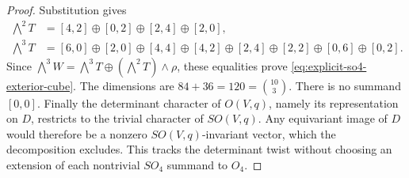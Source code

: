 \begin{proof}
Substitution gives
\begin{align*}
 \bigwedge^2T&=[4,2]\oplus[0,2]\oplus[2,4]\oplus[2,0],\\
 \bigwedge^3T&=[6,0]\oplus[2,0]\oplus[4,4]\oplus[4,2]
       \oplus[2,4]\oplus[2,2]\oplus[0,6]\oplus[0,2].
\end{align*}
Since \(\bigwedge^3W=\bigwedge^3T\oplus
(\bigwedge^2T)\wedge\rho\), these equalities prove
\eqref{eq:explicit-so4-exterior-cube}.  The dimensions are
\(84+36=120=\binom{10}{3}\).  There is no summand \([0,0]\).
Finally the determinant character of \(O(V,q)\), namely its
representation on \(D\), restricts to the trivial character of
\(SO(V,q)\).  Any equivariant image of \(D\) would therefore
be a nonzero \(SO(V,q)\)-invariant vector, which the decomposition
excludes.  This tracks the determinant twist without choosing an
extension of each nontrivial \(SO_4\) summand to \(O_4\).
\end{proof}

